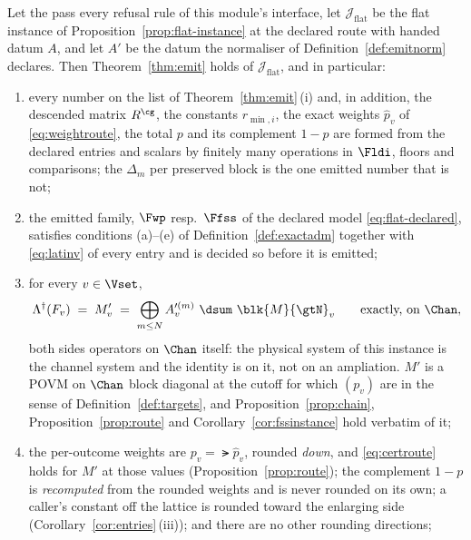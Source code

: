 \begin{corollary}\label{cor:emitted-flat}
Let the  pass every refusal rule of this module's
interface, let
$\mathcal{J}_{\mathrm{flat}}$ be the flat instance of
Proposition~\ref{prop:flat-instance} at the declared route with handed datum
$A$, and let $A'$ be the datum the normaliser of
Definition~\ref{def:emitnorm} declares. Then Theorem~\ref{thm:emit} holds of
$\mathcal{J}_{\mathrm{flat}}$, and in particular:
\begin{enumerate}[label=(\roman*),leftmargin=3.0em]
\item every number on the list of Theorem~\ref{thm:emit}\,(i) and, in
  addition, the descended matrix $R^{\cg}$, the constants $r_{\min,i}$, the
  exact weights $\hat p_v$ of \eqref{eq:weightroute}, the total $p$ and its
  complement $1-p$ are formed from the declared entries and scalars by
  finitely many operations in $\Fldi$, floors and comparisons; the
   $\Delta_m$ per preserved block is the one
  emitted number that is not;
\item the emitted family, $\Fwp$ resp.\ $\Ffss$ of the declared model
  \eqref{eq:flat-declared}, satisfies conditions (a)--(e) of
  Definition~\ref{def:exactadm} together with \eqref{eq:latinv} of every
  entry and is decided so before it is emitted;
\item for every $v\in\Vset$,
  \begin{equation}\label{eq:emitted-flat}
    \Lambda^{\dagger}(F_v)\;=\;M'_v\;=\;\bigoplus_{m\le N}A'^{(m)}_v\ \dsum\ \blk{M}{\gtN}_v
    \qquad\text{exactly, on }\Chan ,
  \end{equation}
  both sides operators on $\Chan$ itself: the physical system of this
  instance is the channel system and the identity is on it, not on an
  ampliation. $M'$ is a POVM on $\Chan$ block diagonal at the cutoff for which
  $(p_v)$ are  in the sense of
  Definition~\ref{def:targets}, and Proposition~\ref{prop:chain},
  Proposition~\ref{prop:route} and Corollary~\ref{cor:fssinstance} hold
  verbatim of it;
\item the per-outcome weights are $p_v=\lat{\hat p_v}$, rounded \emph{down},
  and \eqref{eq:certroute} holds for $M'$ at those values
  (Proposition~\ref{prop:route}); the complement $1-p$ is \emph{recomputed}
  from the rounded weights and is never rounded on its own; a caller's
  constant off the lattice is rounded toward the enlarging side
  (Corollary~\ref{cor:entries}\,(iii)); and there are no other rounding
  directions;

\end{enumerate}
\end{corollary}
